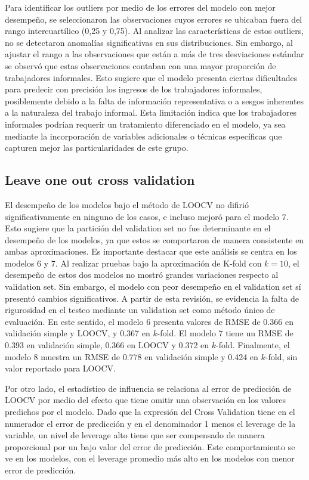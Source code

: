 \documentclass[article,11 pt]{article}
\begin{document}
Para identificar los outliers por medio de los errores del modelo con mejor desempeño, se seleccionaron las observaciones cuyos errores se ubicaban fuera del rango intercuartílico (0,25 y 0,75). Al analizar las características de estos outliers, no se detectaron anomalías significativas en sus distribuciones. Sin embargo, al ajustar el rango a las observaciones que están a más de tres desviaciones estándar se observó que estas observaciones contaban con una mayor proporción de trabajadores informales. Esto sugiere que el modelo presenta ciertas dificultades para predecir con precisión los ingresos de los trabajadores informales, posiblemente debido a la falta de información representativa o a sesgos inherentes a la naturaleza del trabajo informal. Esta limitación indica que los trabajadores informales podrían requerir un tratamiento diferenciado en el modelo, ya sea mediante la incorporación de variables adicionales o técnicas específicas que capturen mejor las particularidades de este grupo.

\subsection{Leave one out cross validation}

El desempeño de los modelos bajo el método de LOOCV no difirió significativamente en ninguno de los casos, e incluso mejoró para el modelo 7. Esto sugiere que la partición del validation set no fue determinante en el desempeño de los modelos, ya que estos se comportaron de manera consistente en ambas aproximaciones. Es importante destacar que este análisis se centra en los modelos 6 y 7. Al realizar pruebas bajo la aproximación de K-fold con $k=10$, el desempeño de estos dos modelos no mostró grandes variaciones respecto al validation set. Sin embargo, el modelo con peor desempeño en el validation set sí presentó cambios significativos. A partir de esta revisión, se evidencia la falta de rigurosidad en el testeo mediante un validation set como método único de evaluación. En este sentido, el modelo 6 presenta valores de RMSE de 0.366 en validación simple y LOOCV, y 0.367 en $k$-fold. El modelo 7 tiene un RMSE de 0.393 en validación simple, 0.366 en LOOCV y 0.372 en $k$-fold. Finalmente, el modelo 8 muestra un RMSE de 0.778 en validación simple y 0.424 en $k$-fold, sin valor reportado para LOOCV.

\bigskip

Por otro lado, el estadístico de influencia se relaciona al error de predicción de LOOCV por medio del efecto que tiene omitir una observación en los valores predichos por el modelo. Dado que la expresión del Cross Validation tiene en el numerador el error de predicción y en el denominador 1 menos el leverage de la variable, un nivel de leverage alto tiene que ser compensado de manera proporcional por un bajo valor del error de predicción. Este comportamiento se ve en los modelos, con el leverage promedio más alto en los modelos con menor error de predicción.
\end{document}
